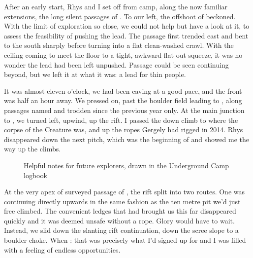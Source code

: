 After an early start, Rhys and I set off from camp, along the now familiar  extensions, the long silent passages of . To our left, the offshoot of  beckoned. With the limit of exploration so close, we could not help but have a look at it, to assess the feasibility of pushing the lead. The passage first trended east and bent to the south sharply before turning into a flat clean-washed crawl. With the ceiling coming to meet the floor to a tight, awkward flat out squeeze, it was no wonder the lead had been left unpushed. Passage could be seen continuing beyond, but we left it at what it was: a lead for thin people.

It was almost eleven o'clock, we had been caving at a good pace, and the front was half an hour away. We pressed on, past the boulder field leading to , along passages named and trodden since the previous year only. At the main junction to , we turned left, upwind, up the rift. I passed the down climb to  where the corpse of the Creature was, and up the ropes Gergely had rigged in 2014. Rhys disappeared down the next pitch, which was the beginning of  and showed me the way up the climbs.

\begin{figure}[t!]
\checkoddpage \ifoddpage \forcerectofloat \else \forceversofloat \fi
\centering
{}
\caption{Helpful notes for future \protect{} explorers, drawn in the Underground Camp logbook }
\label{Notebook}
\end{figure}

At the very apex of surveyed passage of , the rift split into two routes. One was continuing directly upwards in the same fashion as the ten metre pit we'd just free climbed. The convenient ledges that had brought us this far disappeared quickly and it was deemed unsafe without a rope. Glory would have to wait. Instead, we slid down the slanting rift continuation, down the scree slope to a boulder choke. When : that was precisely what I'd signed up for and I was filled with a feeling of endless opportunities.

